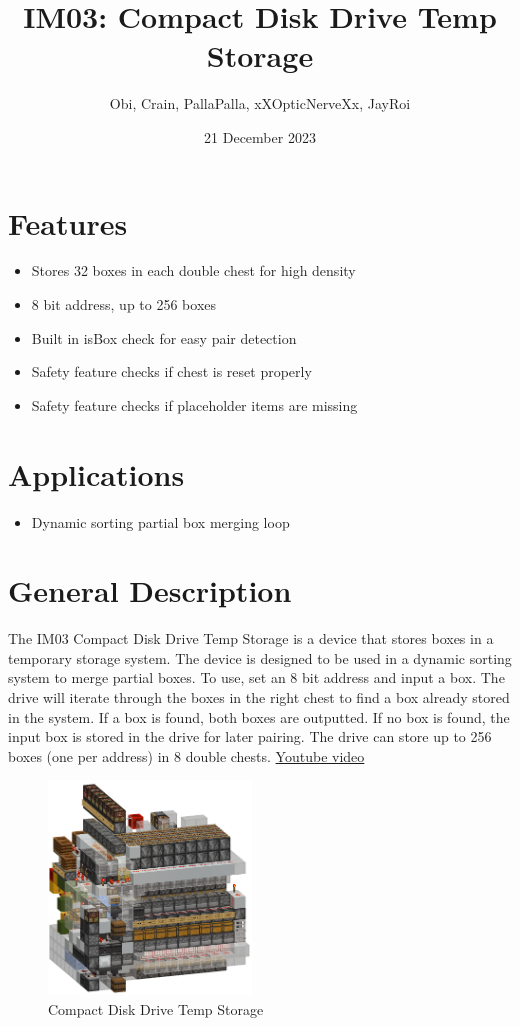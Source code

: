\documentclass[10pt]{datasheet}
\title{IM03: Compact Disk Drive Temp Storage}
\author{Obi, Crain, PallaPalla, xXOpticNerveXx, JayRoi}
\date{21 December 2023}
\begin{document}
\maketitle

\section{Features}

\begin{itemize}
\item{Stores 32 boxes in each double chest for high density}
\item{8 bit address, up to 256 boxes}
\item{Built in isBox check for easy pair detection}
\item{Safety feature checks if chest is reset properly}
\item{Safety feature checks if placeholder items are missing}
\end{itemize}

\section{Applications}

\begin{itemize}
\item{Dynamic sorting partial box merging loop}
\end{itemize}

\section{General Description}

The IM03 Compact Disk Drive Temp Storage is a device that stores boxes in a temporary storage system. The device is designed to be used in a dynamic sorting system to merge partial boxes. To use, set an 8 bit address and input a box. The drive will iterate through the boxes in the right chest to find a box already stored in the system. If a box is found, both boxes are outputted. If no box is found, the input box is stored in the drive for later pairing. The drive can store up to 256 boxes (one per address) in 8 double chests. \href{https://www.youtube.com/watch?v=_OpecWSo2yc}{Youtube video}

\vfill\break

\begin{figure}[h]
    \centering
    \includegraphics[width=0.48\textwidth]{diskdrive.png}
    \caption{\centering Compact Disk Drive Temp Storage}
\end{figure}
\end{document}
